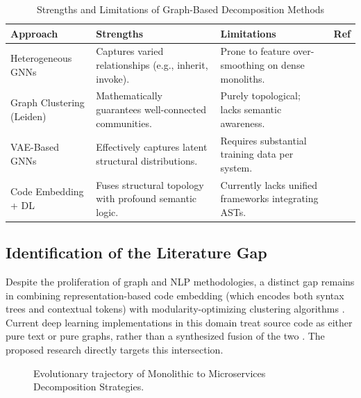 \documentclass[12pt, a4paper]{article}
\begin{document}
\begin{table}[htbp]
\centering
\caption{Strengths and Limitations of Graph-Based Decomposition Methods}
\label{tab:gnn_comp}
\begin{tabularx}{\textwidth}{@{}l >{\raggedright\arraybackslash}X >{\raggedright\arraybackslash}X c@{}}
\toprule
\textbf{Approach} & \textbf{Strengths} & \textbf{Limitations} & \textbf{Ref} \\
\midrule
Heterogeneous GNNs & Captures varied relationships (e.g., inherit, invoke). & Prone to feature over-smoothing on dense monoliths. & \cite{mathai2022} \\
Graph Clustering (Leiden) & Mathematically guarantees well-connected communities. & Purely topological; lacks semantic awareness. & \cite{traag2019, filippone2023} \\
VAE-Based GNNs & Effectively captures latent structural distributions. & Requires substantial training data per system. & \cite{maharjan2025, sooksatra2022} \\
Code Embedding + DL & Fuses structural topology with profound semantic logic. & Currently lacks unified frameworks integrating ASTs. & \cite{aldebagy2021, naik2024} \\
\bottomrule
\end{tabularx}
\end{table}

\subsection{Identification of the Literature Gap}
Despite the proliferation of graph and NLP methodologies, a distinct gap remains in combining representation-based code embedding (which encodes both syntax trees and contextual tokens) with modularity-optimizing clustering algorithms \cite{alwis2025, chaieb2024}. Current deep learning implementations in this domain treat source code as either pure text or pure graphs, rather than a synthesized fusion of the two \cite{liu2024, wang2024}. The proposed research directly targets this intersection.

\begin{figure}[htbp]
    \centering
    \caption{Evolutionary trajectory of Monolithic to Microservices Decomposition Strategies.}
    \label{fig:lit_review_evolution}
\end{figure}
\end{document}
